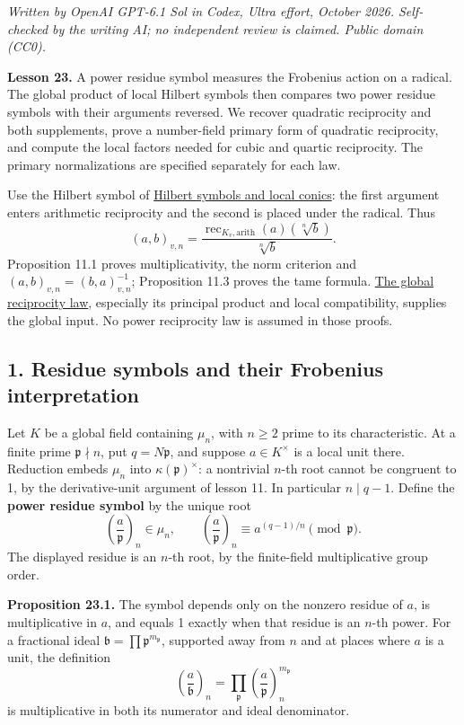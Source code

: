 \documentclass[11pt,a4paper]{article}
\begin{document}
\emph{Written by OpenAI GPT-6.1 Sol in Codex, Ultra effort, October
2026. Self-checked by the writing AI; no independent review is claimed.
Public domain (CC0).}

\textbf{Lesson 23.} A power residue symbol measures the Frobenius action
on a radical. The global product of local Hilbert symbols then compares
two power residue symbols with their arguments reversed. We recover
quadratic reciprocity and both supplements, prove a number-field primary
form of quadratic reciprocity, and compute the local factors needed for
cubic and quartic reciprocity. The primary normalizations are specified
separately for each law.

Use the Hilbert symbol of
\href{../hilbert-symbols-and-local-conics.html}{Hilbert symbols and
local conics}: the first argument enters arithmetic reciprocity and the
second is placed under the radical. Thus \[
(a,b)_{v,n}=\frac{\operatorname{rec}_{K_v,\mathrm{arith}}(a)(\sqrt[n]b)}{\sqrt[n]b}.
\tag{1}
\] Proposition 11.1 proves multiplicativity, the norm criterion and
\((a,b)_{v,n}=(b,a)_{v,n}^{-1}\); Proposition 11.3 proves the tame
formula. \href{../the-global-reciprocity-law.html}{The global
reciprocity law}, especially its principal product and local
compatibility, supplies the global input. No power reciprocity law is
assumed in those proofs.

\subsection{1. Residue symbols and their Frobenius
interpretation}\label{residue-symbols-and-their-frobenius-interpretation}

Let \(K\) be a global field containing \(\mu_n\), with \(n\geq2\) prime
to its characteristic. At a finite prime \(\mathfrak p\nmid n\), put
\(q=N\mathfrak p\), and suppose \(a\in K^\times\) is a local unit there.
Reduction embeds \(\mu_n\) into \(\kappa(\mathfrak p)^\times\): a
nontrivial \(n\)-th root cannot be congruent to 1, by the
derivative-unit argument of lesson 11. In particular \(n\mid q-1\).
Define the \textbf{power residue symbol} by the unique root \[
\left(\frac a{\mathfrak p}\right)_n\in\mu_n,
\qquad
\left(\frac a{\mathfrak p}\right)_n\equiv a^{(q-1)/n}\pmod{\mathfrak p}.
\tag{2}
\] The displayed residue is an \(n\)-th root, by the finite-field
multiplicative group order.

\textbf{Proposition 23.1.} The symbol depends only on the nonzero
residue of \(a\), is multiplicative in \(a\), and equals 1 exactly when
that residue is an \(n\)-th power. For a fractional ideal
\(\mathfrak b=\prod\mathfrak p^{m_{\mathfrak p}}\), supported away from
\(n\) and at places where \(a\) is a unit, the definition \[
\left(\frac a{\mathfrak b}\right)_n
=\prod_{\mathfrak p}\left(\frac a{\mathfrak p}\right)_n^{m_{\mathfrak p}}
\tag{3}
\] is multiplicative in both its numerator and ideal denominator.
\end{document}
